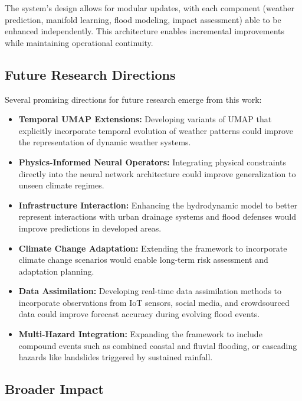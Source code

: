 \documentclass{article}
\begin{document}
The system's design allows for modular updates, with each component (weather prediction, manifold learning, flood modeling, impact assessment) able to be enhanced independently. This architecture enables incremental improvements while maintaining operational continuity.

\subsection{Future Research Directions}

Several promising directions for future research emerge from this work:

\begin{itemize}
    \item \textbf{Temporal UMAP Extensions:} Developing variants of UMAP that explicitly incorporate temporal evolution of weather patterns could improve the representation of dynamic weather systems.
    
    \item \textbf{Physics-Informed Neural Operators:} Integrating physical constraints directly into the neural network architecture could improve generalization to unseen climate regimes.
    
    \item \textbf{Infrastructure Interaction:} Enhancing the hydrodynamic model to better represent interactions with urban drainage systems and flood defenses would improve predictions in developed areas.
    
    \item \textbf{Climate Change Adaptation:} Extending the framework to incorporate climate change scenarios would enable long-term risk assessment and adaptation planning.
    
    \item \textbf{Data Assimilation:} Developing real-time data assimilation methods to incorporate observations from IoT sensors, social media, and crowdsourced data could improve forecast accuracy during evolving flood events.
    
    \item \textbf{Multi-Hazard Integration:} Expanding the framework to include compound events such as combined coastal and fluvial flooding, or cascading hazards like landslides triggered by sustained rainfall.
\end{itemize}

\subsection{Broader Impact}
\end{document}
